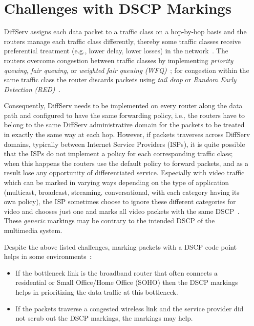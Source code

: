 

\section{Challenges with DSCP Markings}
\label{rg.ch.dscp}

DiffServ assigns each data packet to a traffic class on a hop-by-hop basis and
the routers manage each traffic class differently, thereby some traffic
classes receive preferential treatment (e.g., lower delay, lower losses) in
the network~\cite{rfc2475}. The routers overcome congestion between traffic
classes by implementing \emph{priority queuing}, \emph{fair queuing}, or
\emph{weighted fair queuing (WFQ)}~\cite{rfc4594}; for congestion within the
same traffic class the router discards packets using \emph{tail drop} or
\emph{Random Early Detection (RED)}~\cite{Floyd:RED}.

Consequently, DiffServ needs to be implemented on every router along the data
path and configured to have the same forwarding policy, i.e., the routers have
to belong to the same DiffServ administrative domain for the packets to be
treated in exactly the same way at each hop. However, if packets traverses
across DiffServ domains, typically between Internet Service Providers (ISPs),
it is quite possible that the ISPs do not implement a policy for each
corresponding traffic class; when this happens the routers use the default
policy to forward packets, and as a result lose any opportunity of
differentiated service. Especially with video traffic which can be marked in
varying ways depending on the type of application (multicast, broadcast,
streaming, conversational, with each category having its own policy), the ISP
sometimes choose to ignore these different categories for video and chooses
just one and marks all video packets with the same DSCP~\cite{rfc5865}. These
\emph{generic} markings may be contrary to the intended DSCP of the multimedia
system.



Despite the above listed challenges, marking packets with a DSCP code point
helps in some environments~\cite{draft.rtcweb.qos}:

\begin{itemize}
	
    \item If the bottleneck link is the broadband router that often connects a
    residential or Small Office/Home Office (SOHO) then the DSCP markings 
    helps in prioritizing the data traffic at this bottleneck.

	\item If the packets traverse a congested wireless link and the service 
	provider did not scrub out the DSCP markings, the markings may help.

\end{itemize}

